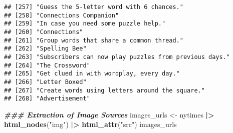\documentclass[
]{article}
\newenvironment{Shaded}{\begin{snugshade}}{\end{snugshade}}
\newcommand{\DocumentationTok}[1]{\textcolor[rgb]{0.56,0.35,0.01}{\textbf{\textit{#1}}}}
\newcommand{\FunctionTok}[1]{\textcolor[rgb]{0.13,0.29,0.53}{\textbf{#1}}}
\newcommand{\NormalTok}[1]{#1}
\newcommand{\OtherTok}[1]{\textcolor[rgb]{0.56,0.35,0.01}{#1}}
\newcommand{\SpecialCharTok}[1]{\textcolor[rgb]{0.81,0.36,0.00}{\textbf{#1}}}
\newcommand{\StringTok}[1]{\textcolor[rgb]{0.31,0.60,0.02}{#1}}
\begin{document}
\begin{verbatim}
## [257] "Guess the 5-letter word with 6 chances."                                                                                                                  
## [258] "Connections Companion"                                                                                                                                    
## [259] "In case you need some puzzle help."                                                                                                                       
## [260] "Connections"                                                                                                                                              
## [261] "Group words that share a common thread."                                                                                                                  
## [262] "Spelling Bee"                                                                                                                                             
## [263] "Subscribers can now play puzzles from previous days."                                                                                                     
## [264] "The Crossword"                                                                                                                                            
## [265] "Get clued in with wordplay, every day."                                                                                                                   
## [266] "Letter Boxed"                                                                                                                                             
## [267] "Create words using letters around the square."                                                                                                            
## [268] "Advertisement"
\end{verbatim}

\begin{Shaded}
\begin{Highlighting}[]
\DocumentationTok{\#\#\# Extraction of Image Sources}
\NormalTok{images\_urls }\OtherTok{\textless{}{-}}\NormalTok{ nytimes }\SpecialCharTok{|\textgreater{}} 
  \FunctionTok{html\_nodes}\NormalTok{(}\StringTok{"img"}\NormalTok{) }\SpecialCharTok{|\textgreater{}}
  \FunctionTok{html\_attr}\NormalTok{(}\StringTok{"src"}\NormalTok{)}
\NormalTok{images\_urls}
\end{Highlighting}
\end{Shaded}
\end{document}
